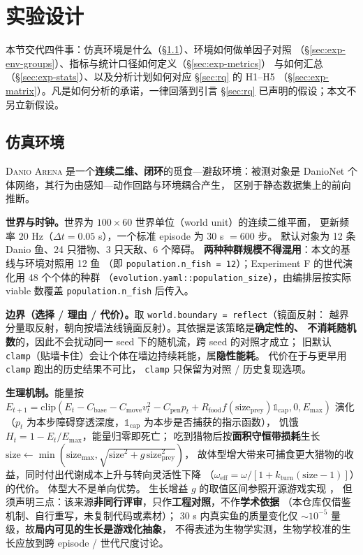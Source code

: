 \section{实验设计}\label{sec:experiment}

本节交代四件事：仿真环境是什么（\S\ref{sec:exp-env}）、环境如何做单因子对照
（\S\ref{sec:exp-env-groups}）、指标与统计口径如何定义（\S\ref{sec:exp-metrics}）
与如何汇总（\S\ref{sec:exp-stats}）、以及分析计划如何对应 \S\ref{sec:rq} 的 H1--H5
（\S\ref{sec:exp-matrix}）。凡是如何分析的承诺，一律回落到引言
\S\ref{sec:rq} 已声明的假设；本文不另立新假设。

\subsection{仿真环境}\label{sec:exp-env}

\textsc{Danio Arena} 是一个\textbf{连续二维、闭环}的觅食—避敌环境：被测对象是
DanioNet 个体网络，其行为由感知—动作回路与环境耦合产生，
区别于静态数据集上的前向推断。

\textbf{世界与时钟。}世界为 $100\times60$ 世界单位（world unit）的连续二维平面，
更新频率 $20$ Hz（$\Delta t = 0.05$ s），一个标准 episode 为 $30$ s $=600$ 步。
默认对象为 12 条 Danio 鱼、24 只猎物、3 只天敌、6 个障碍。
\textbf{两种种群规模不得混用}：本文的基线与环境对照用 12 鱼
（即 \texttt{population.n\_fish = 12}）；Experiment F 的世代演化用 48 个个体的种群
（\texttt{evolution.yaml::population\_size}），由编排层按实际 viable 数覆盖
\texttt{population.n\_fish} 后传入。

\textbf{边界（选择 / 理由 / 代价）。}取 \texttt{world.boundary = reflect}（镜面反射：
越界分量取反射，朝向按墙法线镜面反射）。其依据是该策略是\textbf{确定性的、
不消耗随机数}的，因此不会扰动同一 seed 下的随机流，跨 seed 的对照才成立；
旧默认 \texttt{clamp}（贴墙卡住）会让个体在墙边持续耗能，属\textbf{隐性能耗}。
代价在于与更早用 \texttt{clamp} 跑出的历史结果不可比，
\texttt{clamp} 只保留为对照 / 历史复现选项。

\textbf{生理机制。}能量按
$E_{t+1}=\mathrm{clip}(E_t-C_{\text{base}}-C_{\text{move}}v_t^2-C_{\text{pen}}p_t
+R_{\text{food}}f(\text{size}_{\text{prey}})\mathbb{1}_{\text{cap}},0,E_{\max})$
演化（$p_t$ 为本步障碍穿透深度，$\mathbb{1}_{\text{cap}}$ 为本步是否捕获的指示函数），
饥饿 $H_t=1-E_t/E_{\max}$，能量归零即死亡；
吃到猎物后按\textbf{面积守恒带损耗}生长
$\text{size}\leftarrow\min(\text{size}_{\max},\sqrt{\text{size}^2+g\,\text{size}_{\text{prey}}^2})$，
故体型增大带来可捕食更大猎物的收益，同时付出代谢成本上升与转向灵活性下降
（$\omega_{\text{eff}}=\omega/[1+k_{\text{turn}}(\text{size}-1)]$）的代价。
体型大不是单向优势。
生长增益 $g$ 的取值区间参照开源游戏实现 \citep{bib215_testn.d.}，
但须声明三点：该来源\textbf{非同行评审}，只作\textbf{工程对照}，不作\textbf{学术依据}
（本仓库仅借鉴机制、自行重写，未复制代码或素材）；
$30$ s 内真实鱼的质量变化仅 $\sim10^{-5}$ 量级，故\textbf{局内可见的生长是游戏化抽象}，
不得表述为生物学实测，生物学校准的生长应放到跨 episode / 世代尺度讨论。

